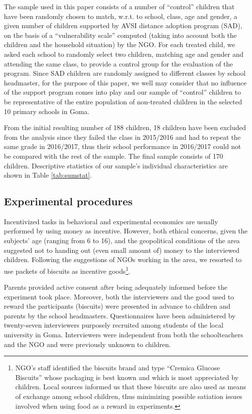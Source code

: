 \documentclass[authoryear, preprint, review, 12pt]{elsarticle}
\begin{document}
The sample used in this paper consists of a number of \enquote{control} children that have been randomly chosen to match, w.r.t. to school, class, age and gender, a given number of children supported by AVSI distance adoption program (SAD), on the basis of a \enquote{vulnerability scale} computed (taking into account both the children and the household situation) by the NGO.
For each treated child, we asked each school to randomly select two children, matching age and gender and attending the same class, to provide a control group for the evaluation of the program. Since SAD children are randomly assigned to different classes by school headmaster, for the purpose of this paper, we well may consider that no influence of the support program comes into play and our sample of \enquote{control} children to be representative of the entire population of non-treated children in the selected 10 primary schools in Goma. 

From the initial resulting number of 188 children, 18 children have been excluded from the analysis since they failed the class in 2015/2016 and had to repeat the same grade in 2016/2017, thus their school performance in 2016/2017 could not be compared with the rest of the sample. The final sample consists of 170 children. Descriptive statistics of our sample's individual characteristics are shown in Table \ref{tab:sumstat}. 

\subsection{Experimental procedures}
\label{subsec:ExpProc}
Incentivized tasks in behavioral and experimental economics are usually performed by using money as incentive. However, both ethical concerns, given the subjects' age (ranging from 6 to 16), and the geopolitical conditions of the area suggested not to handing out (even small amount of) money to the interviewed children. Following the suggestions of NGOs working in the area, we resorted to use packets of biscuits as incentive goods\footnote{NGO's staff identified the biscuits brand and type \enquote{Cremica Glucose Biscuits} whose packaging is best known and which is most appreciated by children. Local sources informed us that these biscuits are also used as means of exchange among school children, thus minimizing possible satiation issues involved when using food as a reward in experiments.}. 

Parents provided active consent after being adequately informed before the experiment took place. Moreover, both the interviewers and the good used to reward the participants (biscuits) were presented in advance to children and parents by the school headmasters. Questionnaires have been administered by twenty-seven interviewers purposely recruited among students of the local university in Goma. Interviewers were independent from both the schoolteachers and the NGO and were previously unknown to children.
\end{document}
